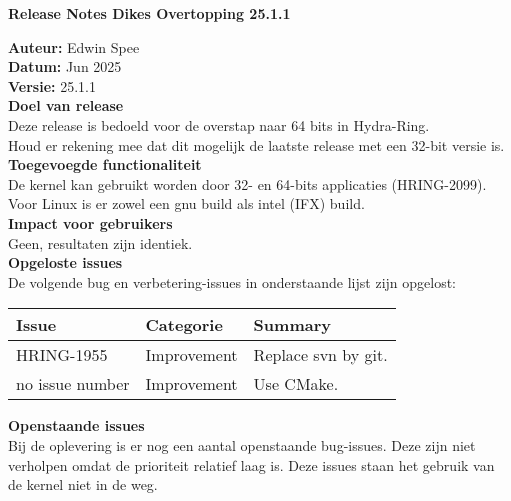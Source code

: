 \documentclass{BOI_References/BOIReleaseNotesLatexClass}
\begin{document}
{\LARGE\textbf{Release Notes Dikes Overtopping 25.1.1}} 

\textbf{Auteur:} Edwin Spee \\
\textbf{Datum:} Jun 2025 \\
\textbf{Versie:} 25.1.1 \\

\textbf{Doel van release} \\
Deze release is bedoeld voor de overstap naar 64 bits in Hydra-Ring. \\
Houd er rekening mee dat dit mogelijk de laatste release met een 32-bit versie is. \\[6pt]

\textbf{Toegevoegde functionaliteit} \\
De kernel kan gebruikt worden door 32- en 64-bits applicaties (HRING-2099). \\
Voor Linux is er zowel een gnu build als intel (IFX) build. \\

\textbf{Impact voor gebruikers} \\
Geen, resultaten zijn identiek. \\[6pt]

\textbf{Opgeloste issues} \\
De volgende bug en verbetering-issues in onderstaande lijst zijn opgelost:

\renewcommand{\arraystretch}{1.2}

\begin{longtable*}{|p{30mm}|p{22mm}|p{\textwidth-52mm-36pt}|} \hline
\textbf{Issue} & \textbf{Categorie} & \textbf{Summary} \\ \hline
HRING-1955 & Improvement  & Replace svn by git. \\ \hline
no issue number & Improvement  & Use CMake. \\ \hline
\end{longtable*}

\textbf{Openstaande issues} \\
Bij de oplevering is er nog een aantal openstaande bug-issues. 
Deze zijn niet verholpen omdat de prioriteit relatief laag is. 
Deze issues staan het gebruik van de kernel niet in de weg.

\end{document}
